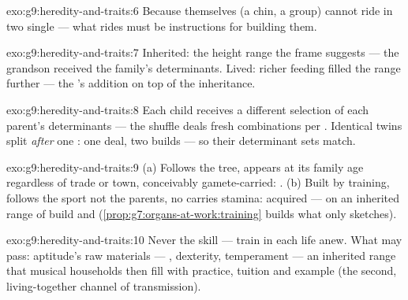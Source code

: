\begin{solution}{exo:g9:heredity-and-traits:6}
Because  themselves (a chin, a  group) cannot
ride in two single  --- what rides must be
instructions for building them.
\end{solution}

\begin{solution}{exo:g9:heredity-and-traits:7}
Inherited: the height range the frame suggests --- the
grandson received the family's determinants. Lived: richer
feeding filled the range further --- the 's
addition on top of the inheritance.
\end{solution}

\begin{solution}{exo:g9:heredity-and-traits:8}
Each child receives a different selection of each parent's
determinants --- the shuffle deals fresh combinations per
. Identical twins split \emph{after} one
: one deal, two builds --- so their
determinant sets match.
\end{solution}

\begin{solution}{exo:g9:heredity-and-traits:9}
(a) Follows the tree, appears at its family age
regardless of trade or town, conceivably gamete-carried:
. (b) Built by training, follows the sport not
the parents, no  carries stamina: acquired --- on an
inherited range of build and 
(\cref{prop:g7:organs-at-work:training} builds what
 only sketches).
\end{solution}

\begin{solution}{exo:g9:heredity-and-traits:10}
Never the skill ---  train in each life anew. What
may pass: aptitude's raw materials --- , dexterity,
temperament --- an inherited range that musical households
then fill with practice, tuition and example (the second,
living-together channel of transmission).
\end{solution}

